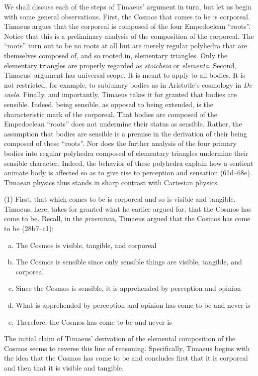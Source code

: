 We shall discuss each of the steps of Timaeus' argument in turn, but let us begin with some general observations. First, the Cosmos that comes to be is corporeal. Timaeus argues that the corporeal is composed of the four Empedoclean ``roots''. Notice that this is a preliminary analysis of the composition of the corporeal. The ``roots'' turn out to be no roots at all but are merely regular polyhedra that are themselves composed of, and so rooted in, elementary triangles. Only the elementary triangles are properly regarded as \emph{stoicheia} or \emph{elementa}. Second, Timaeus' argument has universal scope. It is meant to apply to all bodies. It is not restricted, for example, to sublunary bodies as in Aristotle's cosmology in \emph{De caelo}. Finally, and importantly, Timaeus takes it for granted that bodies are sensible. Indeed, being sensible, as opposed to being extended, is the characteristic mark of the corporeal. That bodies are composed of the Empedoclean ``roots'' does not undermine their status as sensible. Rather, the assumption that bodies are sensible is a premise in the derivation of their being composed of these ``roots''. Nor does the further analysis of the four primary bodies into regular polyhedra composed of elementary triangles undermine their sensible character. Indeed, the behavior of these polyhedra explain how a sentient animate body is affected so as to give rise to perception and sensation (61d--68e). Timaean physics thus stands in sharp contrast with Cartesian physics.

(1) First, that which comes to be is corporeal and so is visible and tangible. Timaeus, here, takes for granted what he earlier argued for, that the Cosmos has come to be. Recall, in the \emph{proemium}, Timaeus argued that the Cosmos has come to be (28b7--c1):
\begin{enumerate}[(a)]
	\item The Cosmos is visible, tangible, and corporeal
	\item The Cosmos is sensible since only sensible things are visible, tangible, and corporeal
	\item Since the Cosmos is sensible, it is apprehended by perception and opinion
	\item What is apprehended by perception and opinion has come to be and never is
	\item Therefore, the Cosmos has come to be and never is
\end{enumerate}
The initial claim of Timaeus' derivation of the elemental composition of the Cosmos seems to reverse this line of reasoning. Specifically, Timaeus begins with the idea that the Cosmos has come to be and concludes first that it is corporeal and then that it is visible and tangible. 

